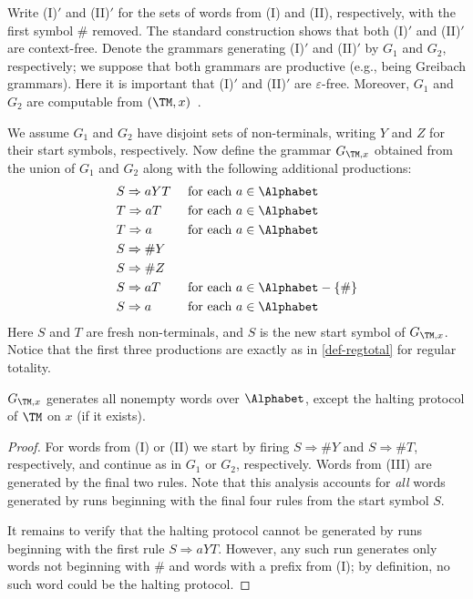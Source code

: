 Write (I)$'$ and (II)$'$ for the sets of words from (I) and (II), respectively, with the first symbol $\#$ removed.
The standard construction shows that both (I)$'$ and (II)$'$ are context-free. Denote the grammars generating (I)$'$ and (II)$'$ by $G_1$ and $G_2$, respectively; we suppose that both grammars are productive (e.g., being Greibach grammars). Here it is important that (I)$'$ and (II)$'$ are $\varepsilon$-free. Moreover, $G_1$ and $G_2$ are computable from $(\TM,x)$~\cite[Section~2.1]{Kuznetsov2021TOCL}. 

We assume $G_1$ and $G_2$ have disjoint sets of non-terminals, writing $Y$ and $Z$ for their start symbols, respectively. 
Now define the grammar $G_{\TM,x}$ obtained from the union of $G_1$ and $G_2$ along with the following additional productions:
\begin{align*}
& S \Rightarrow aYT && \mbox{ for each $a \in \Alphabet$} \\
& T \Rightarrow a T && \mbox{ for each $a \in \Alphabet$} \\
& T \Rightarrow a && \mbox{ for each $a \in \Alphabet$} \\
& S \Rightarrow \# Y \\
& S \Rightarrow \# Z \\
& S \Rightarrow a T && \mbox{ for each $a \in \Alphabet - \{ \# \}$} \\
& S \Rightarrow a && \mbox{ for each $a \in \Alphabet$}
\end{align*}
Here $S$  and $T$ are fresh non-terminals, and $S$ is the new start symbol of $G_{\TM,x}$.
Notice that the first three productions are exactly as in \cref{def-regtotal} for regular totality.

\begin{proposition}
\label{grammar-generates-all-but-haltprot}
    $G_{\TM,x}$ generates all nonempty words over $\Alphabet$, except the halting protocol of $\TM$ on $x$ (if it exists).
\end{proposition}
\begin{proof}
For words from (I) or (II) we start by firing $S \Rightarrow \# Y$ and $S \Rightarrow \# T$, respectively, and continue as in $G_1$ or $G_2$, respectively. 
Words from (III) are generated by the final two rules. Note that this analysis accounts for \emph{all} words generated by runs beginning with the final four rules from the start symbol $S$.

It remains to verify that the halting protocol cannot be generated by runs beginning with the first rule $S \Rightarrow a YT$.
However, any such run generates only words not beginning with $\#$ and words with a prefix from (I); by definition, no such word could be the halting protocol.    
\end{proof}


